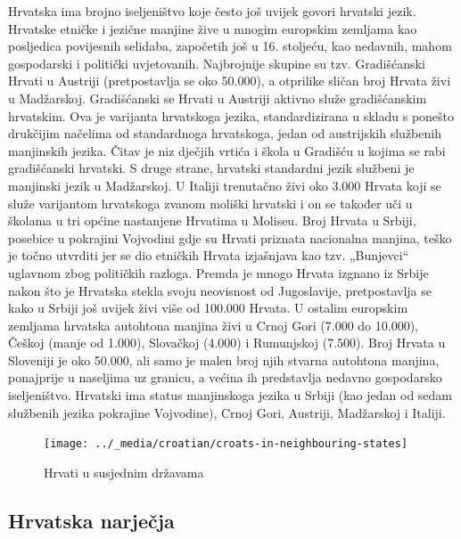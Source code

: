 \begin{multicols}{2}
Hrvatska ima brojno iseljeništvo koje često još uvijek govori hrvatski jezik. Hrvatske etničke i jezične manjine žive u mnogim europskim zemljama kao posljedica povijesnih selidaba, započetih još u 16. stoljeću, kao nedavnih, mahom gospodarski i politički uvjetovanih. Najbrojnije skupine su tzv. Gradišćanski Hrvati u Austriji (pretpostavlja se oko 50.000), a otprilike sličan broj Hrvata živi u Madžarskoj. Gradišćanski se Hrvati u Austriji aktivno služe gradišćanskim hrvatskim. Ova je varijanta hrvatskoga jezika, standardizirana u skladu s ponešto drukčijim načelima od standardnoga hrvatskoga, jedan od austrijskih službenih manjinskih jezika. Čitav je niz dječjih vrtića i škola u Gradišću u kojima se rabi gradišćanski hrvatski. S druge strane, hrvatski standardni jezik službeni je manjinski jezik u Madžarskoj. U Italiji trenutačno živi oko 3.000 Hrvata koji se služe varijantom hrvatskoga zvanom moliški hrvatski i on se također uči u školama u tri općine nastanjene Hrvatima u Moliseu. Broj Hrvata u Srbiji, posebice u pokrajini Vojvodini gdje su Hrvati priznata nacionalna manjina, teško je točno utvrditi jer se dio etničkih Hrvata izjašnjava kao tzv. „Bunjevci“ uglavnom zbog političkih razloga. Premda je mnogo Hrvata izgnano iz Srbije nakon što je Hrvatska stekla svoju neovisnost od Jugoslavije, pretpostavlja se kako u Srbiji još uvijek živi više od 100.000 Hrvata. U ostalim europskim zemljama hrvatska autohtona manjina živi u Crnoj Gori (7.000 do 10.000), Češkoj (manje od 1.000), Slovačkoj (4.000) i Rumunjskoj (7.500). Broj Hrvata u Sloveniji je oko 50.000, ali samo je malen broj njih stvarna autohtona manjina, ponajprije u naseljima uz granicu, a većina ih predstavlja nedavno gospodarsko iseljeništvo. Hrvatski ima status manjinskoga jezika u Srbiji (kao jedan od sedam službenih jezika pokrajine Vojvodine), Crnoj Gori, Austriji, Madžarskoj i Italiji.

\begin{figure}[htb]
  \center
  \texttt{[image: ../\_media/croatian/croats-in-neighbouring-states]}
  \caption{Hrvati u susjednim državama \cite{boo2}}
  \label{fig:hrvati}
\end{figure}

\subsection{Hrvatska narječja}


\end{multicols}
